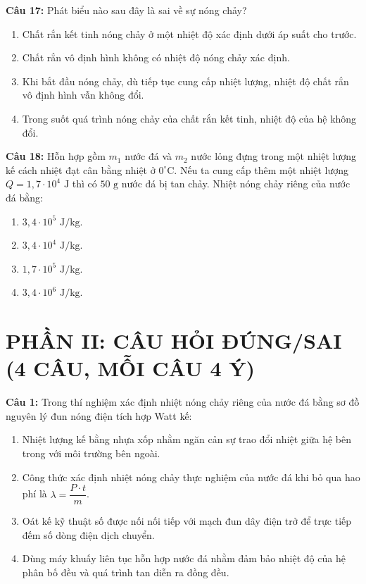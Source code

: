\documentclass[12pt,a4paper]{article}
\begin{document}
\textbf{Câu 17:} Phát biểu nào sau đây là sai về sự nóng chảy?
\begin{enumerate}[label=\Alph*.]
  \item Chất rắn kết tinh nóng chảy ở một nhiệt độ xác định dưới áp suất cho trước.
  \item Chất rắn vô định hình không có nhiệt độ nóng chảy xác định.
  \item Khi bắt đầu nóng chảy, dù tiếp tục cung cấp nhiệt lượng, nhiệt độ chất rắn vô định hình vẫn không đổi.
  \item Trong suốt quá trình nóng chảy của chất rắn kết tinh, nhiệt độ của hệ không đổi.
\end{enumerate}

\textbf{Câu 18:} Hỗn hợp gồm $m_1$ nước đá và $m_2$ nước lỏng đựng trong một nhiệt lượng kế cách nhiệt đạt cân bằng nhiệt ở $0^{\circ}\text{C}$. Nếu ta cung cấp thêm một nhiệt lượng $Q = 1{,}7 \cdot 10^4\text{ J}$ thì có $50\text{ g}$ nước đá bị tan chảy. Nhiệt nóng chảy riêng của nước đá bằng:
\begin{enumerate}[label=\Alph*.]
  \item $3{,}4 \cdot 10^5\text{ J/kg}$.
  \item $3{,}4 \cdot 10^4\text{ J/kg}$.
  \item $1{,}7 \cdot 10^5\text{ J/kg}$.
  \item $3{,}4 \cdot 10^6\text{ J/kg}$.
\end{enumerate}

\section*{PHẦN II: CÂU HỎI ĐÚNG/SAI (4 CÂU, MỖI CÂU 4 Ý)}

\textbf{Câu 1:} Trong thí nghiệm xác định nhiệt nóng chảy riêng của nước đá bằng sơ đồ nguyên lý đun nóng điện tích hợp Watt kế:
\begin{enumerate}[label=\alph*)]
  \item Nhiệt lượng kế bằng nhựa xốp nhằm ngăn cản sự trao đổi nhiệt giữa hệ bên trong với môi trường bên ngoài.
  \item Công thức xác định nhiệt nóng chảy thực nghiệm của nước đá khi bỏ qua hao phí là $\lambda = \dfrac{P \cdot t}{m}$.
  \item Oát kế kỹ thuật số được nối nối tiếp với mạch đun dây điện trở để trực tiếp đếm số dòng điện dịch chuyển.
  \item Dùng máy khuấy liên tục hỗn hợp nước đá nhằm đảm bảo nhiệt độ của hệ phân bố đều và quá trình tan diễn ra đồng đều.
\end{enumerate}
\end{document}
